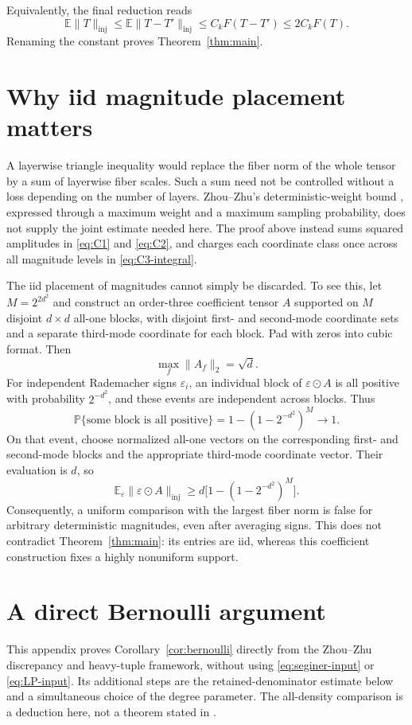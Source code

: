 \documentclass[11pt]{article}
\theoremstyle{spaced}
\theoremstyle{remark}
\numberwithin{equation}{section}
\newcommand{\E}{\mathbb E}
\newcommand{\Pp}{\mathbb P}
\newcommand{\inj}{\mathrm{inj}}
\begin{document}
Equivalently, the final reduction reads
\[
 \E\|T\|_{\inj}\le\E\|T-T'\|_{\inj}
 \le C_kF(T-T')\le2C_kF(T).
\]
Renaming the constant proves Theorem~\ref{thm:main}.

\section{Why iid magnitude placement matters}\label{sec:magnitudes}

A layerwise triangle inequality would replace the fiber norm of the
whole tensor by a sum of layerwise fiber scales. Such a sum need not be
controlled without a loss depending on the number of layers.
Zhou--Zhu's deterministic-weight bound
\cite[Corollary~2.2]{ZZ}, expressed through a maximum weight and a maximum
sampling probability, does not supply the joint estimate needed here.
The proof above instead sums squared amplitudes in
\eqref{eq:C1} and \eqref{eq:C2}, and charges each coordinate class once
across all magnitude levels in \eqref{eq:C3-integral}.

The iid placement of magnitudes cannot simply be discarded. To see
this, let $M=2^{2d^2}$ and construct an order-three coefficient tensor
$A$ supported on $M$ disjoint $d\times d$ all-one blocks, with disjoint
first- and second-mode coordinate sets and a separate third-mode
coordinate for each block. Pad with zeros into cubic format. Then
\[
 \max_f\|A_f\|_2=\sqrt d.
\]
For independent Rademacher signs $\varepsilon_i$, an individual block
of $\varepsilon\odot A$ is all positive with probability $2^{-d^2}$,
and these events are independent across blocks. Thus
\[
 \Pp\{\text{some block is all positive}\}
 =1-(1-2^{-d^2})^M\longrightarrow1.
\]
On that event, choose normalized all-one vectors on the corresponding
first- and second-mode blocks and the appropriate third-mode coordinate
vector. Their evaluation is $d$, so
\[
 \E_\varepsilon\|\varepsilon\odot A\|_{\inj}
 \ge d\bigl[1-(1-2^{-d^2})^M\bigr].
\]
Consequently, a uniform comparison with the largest fiber norm is false
for arbitrary deterministic magnitudes, even after averaging signs.
This does not contradict Theorem~\ref{thm:main}: its entries are iid,
whereas this coefficient construction fixes a highly nonuniform support.

\clearpage
\appendix
\section{A direct Bernoulli argument}\label{app:bernoulli}

This appendix proves Corollary~\ref{cor:bernoulli} directly from the
Zhou--Zhu discrepancy and heavy-tuple framework, without using
\eqref{eq:seginer-input} or \eqref{eq:LP-input}. Its additional steps
are the retained-denominator estimate below and a simultaneous choice
of the degree parameter. The all-density comparison is a deduction
here, not a theorem stated in \cite{ZZ}.
\end{document}
